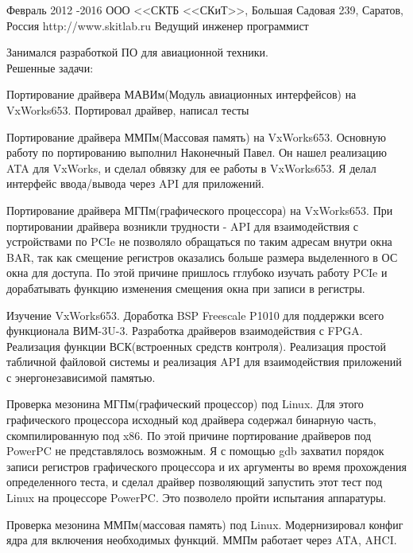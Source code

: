 \job
{Февраль 2012 -}{2016}
{ООО <<СКТБ <<СКиТ>>, Большая Садовая 239, Саратов, Россия}
{http://www.skitlab.ru}
{Ведущий инженер программист}
{Занимался разработкой ПО для авиационной техники.\\

Решенные задачи:
\begin{itemize-noindent}
\item{Портирование драйвера МАВИм(Модуль авиационных интерфейсов) на VxWorks653. Портировал драйвер, написал тесты}
\item{Портирование драйвера ММПм(Массовая память) на VxWorks653. Основную работу по портированию выполнил Наконечный Павел. Он нашел реализацию ATA для VxWorks, и сделал обвязку для ее работы в VxWorks653. Я делал интерфейс ввода/вывода через API для приложений.}
\item{Портирование драйвера МГПм(графического процессора) на VxWorks653. При портировании драйвера возникли трудности - API для взаимодействия с устройствами по PCIe не позволяло обращаться по таким адресам внутри окна BAR, так как смещение регистров оказались больше размера выделенного в ОС окна для доступа. По этой причине пришлось гглубоко изучать работу PCIe и дорабатывать функцию изменения смещения окна при записи в регистры.}
\end{itemize-noindent}
\begin{itemize-noindent}
\item{Изучение VxWorks653. Доработка BSP Freescale P1010 для поддержки всего функционала ВИМ-3U-3. Разработка драйверов взаимодействия с FPGA. Реализация функции ВСК(встроенных средств контроля). Реализация простой табличной файловой системы и реализация API для взаимодействия приложений с энергонезависимой памятью.}
\item{Проверка мезонина МГПм(графический процессор) под Linux. Для этого графического процессора исходный код драйвера содержал бинарную часть, скомпилированную под x86. По этой причине портирование драйверов под PowerPC не представлялось возможным. Я с помощью gdb захватил порядок записи регистров графического процессора и их аргументы во время прохождения определенного теста, и сделал драйвер позволяющий запустить этот тест под Linux на процессоре PowerPC. Это позволело пройти испытания аппаратуры.}
\end{itemize-noindent}
\begin{itemize-noindent}
\item{Проверка мезонина ММПм(массовая память) под Linux. Модернизировал конфиг ядра для включения необходимых функций. ММПм работает через ATA, AHCI.}

\end{itemize-noindent}}
